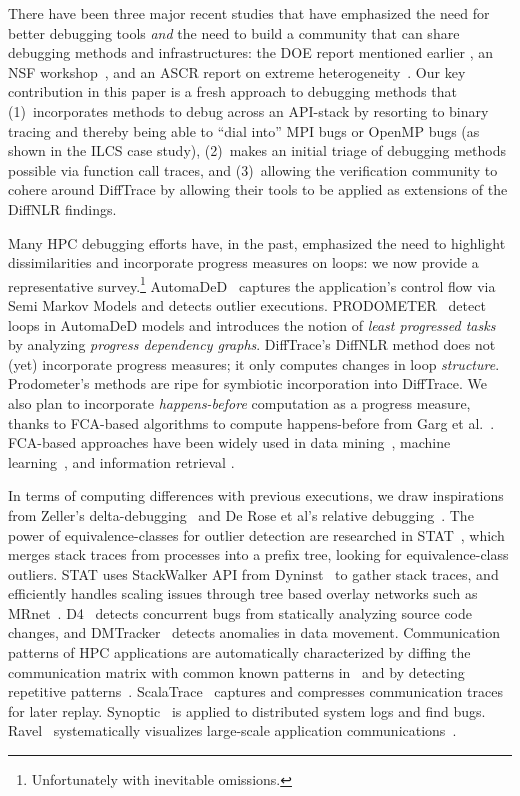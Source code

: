There have been three major recent studies
that have emphasized the need for better debugging tools
{\em and} the need to build a community that can share debugging
methods and infrastructures: the DOE report mentioned
earlier \cite{hpcdoe},
an NSF workshop~\cite{Cohen:2018:IRC:3297279}, and an ASCR report on
extreme heterogeneity~\cite{ascr-report-extreme-heterogeneity}.
%
Our key contribution in this paper is a fresh approach to debugging
methods that (1)~incorporates methods to debug across an API-stack
by resorting to binary tracing and thereby being able to ``dial into''
MPI bugs or OpenMP bugs (as shown in the ILCS case study), (2)~makes
an initial triage of debugging methods possible via function call traces,
and (3)~allowing the verification community to cohere around DiffTrace
by allowing their tools to be applied as extensions of the DiffNLR
findings.


Many HPC debugging efforts have, in the past, emphasized
the need to highlight dissimilarities and
incorporate progress measures on loops: we now
provide a representative survey.\footnote{Unfortunately with inevitable omissions.}
%
AutomaDeD~\cite{automaded-GBron}\cite{automaded-laguna}
captures the application's control flow
via Semi Markov Models and detects outlier executions.
%
PRODOMETER~\cite{prodometer} detect loops in
AutomaDeD models and introduces the
notion of {\em least progressed tasks} by analyzing {\em progress dependency graphs}.
%
DiffTrace's DiffNLR method does not (yet) incorporate progress measures; it only
computes changes in loop {\em structure}.
%
Prodometer's methods are ripe for symbiotic incorporation into DiffTrace.
%
We also plan to incorporate {\em happens-before} computation as a progress measure,
thanks to FCA-based algorithms
to compute happens-before from Garg et al.~\cite{latticeForDistConst,garg_2015}.
%
FCA-based approaches have been widely used  in data mining~\cite{cldm},
machine learning~\cite{clml}, and information retrieval \cite{ignatov17}.


In terms of computing differences with previous executions,
we draw inspirations from
Zeller's delta-debugging~\cite{DBLP:conf/esec/Zeller99}
and De Rose et al's relative debugging~\cite{relative-debugging}.
%
The power of equivalence-classes for outlier detection are
researched in STAT~\cite{stat}, which
merges stack traces from processes into a prefix tree,
looking for equivalence-class outliers.
%
STAT uses StackWalker API from Dyninst~\cite{dyninst} to gather stack traces,
and efficiently handles scaling issues
through tree based overlay networks such as MRnet~\cite{mrnet}.
%
D4~\cite{liu-18} detects concurrent bugs from statically analyzing source code
changes, and DMTracker~\cite{dmtracker} detects anomalies in data movement.
%
Communication patterns of HPC applications are automatically characterized by
diffing the communication matrix with common known patterns in~\cite{roth-15} and by
detecting repetitive patterns~\cite{preissl-08}.
%
ScalaTrace~\cite{scalatrace} captures and compresses communication traces for later replay. 
%
Synoptic~\cite{beschastnikh-synoptic} is applied to distributed
system logs and find bugs.
%
Ravel~\cite{ravel} systematically visualizes
large-scale application communications~\cite{charmVis}. 

